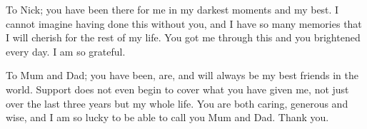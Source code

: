 \bigskip
%
\noindent To Nick; you have been there for me in my darkest moments and my best.  I cannot imagine having done this without you, and I have so many memories that I will cherish for the rest of my life.  You got me through this %
and you brightened every day. I am so grateful.

\bigskip

\noindent To Mum and Dad;  you have been, are, and will always be my best friends in the world.  Support does not even begin to cover what you have given me, not just over the last three years but my whole life.  You are both caring, generous and wise, and I am so lucky to be able to call you Mum and Dad.  Thank you.   




%
%

